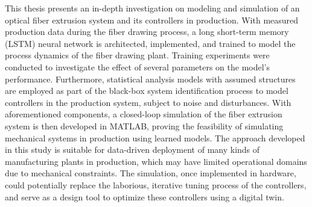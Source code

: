 % 
% 
%


This thesis presents an in-depth investigation on modeling and simulation of an optical fiber extrusion system and its controllers in production. With measured production data during the fiber drawing process, a long short-term memory (LSTM) neural network is architected, implemented, and trained to model the process dynamics of the fiber drawing plant. Training experiments were conducted to investigate the effect of several parameters on the model’s performance. Furthermore, statistical analysis models with assumed structures are employed as part of the black-box system identification process to model controllers in the production system, subject to noise and disturbances. With aforementioned components, a closed-loop simulation of the fiber extrusion system is then developed in MATLAB, proving the feasibility of simulating mechanical systems in production using learned models. The approach developed in this study is suitable for data-driven deployment of many kinds of manufacturing plants in production, which may have limited operational domains due to mechanical constraints. The simulation, once implemented in hardware, could potentially replace the laborious, iterative tuning process of the controllers, and serve as a design tool to optimize these controllers using a digital twin.


